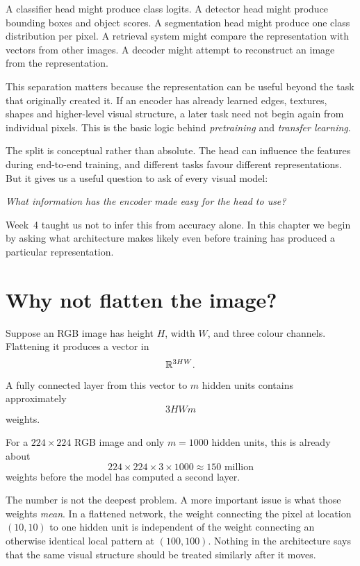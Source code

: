A classifier head might produce class logits. A detector head might produce bounding boxes and object scores. A segmentation head might produce one class distribution per pixel. A retrieval system might compare the representation with vectors from other images. A decoder might attempt to reconstruct an image from the representation.

This separation matters because the representation can be useful beyond the task that originally created it. If an encoder has already learned edges, textures, shapes and higher-level visual structure, a later task need not begin again from individual pixels. This is the basic logic behind \emph{pretraining} and \emph{transfer learning}.

The split is conceptual rather than absolute. The head can influence the features during end-to-end training, and different tasks favour different representations. But it gives us a useful question to ask of every visual model:

\begin{center}
\emph{What information has the encoder made easy for the head to use?}
\end{center}

Week~4 taught us not to infer this from accuracy alone. In this chapter we begin by asking what architecture makes likely even before training has produced a particular representation.

\section{Why not flatten the image?}

Suppose an RGB image has height \(H\), width \(W\), and three colour channels. Flattening it produces a vector in
\[
  \mathbb{R}^{3HW}.
\]
A fully connected layer from this vector to \(m\) hidden units contains approximately
\[
  3HWm
\]
weights.

For a \(224\times224\) RGB image and only \(m=1000\) hidden units, this is already about
\[
  224\times224\times3\times1000 \approx 150\text{ million}
\]
weights before the model has computed a second layer.

The number is not the deepest problem. A more important issue is what those weights \emph{mean}. In a flattened network, the weight connecting the pixel at location \((10,10)\) to one hidden unit is independent of the weight connecting an otherwise identical local pattern at \((100,100)\). Nothing in the architecture says that the same visual structure should be treated similarly after it moves.

